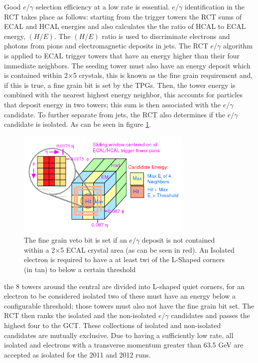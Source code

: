Good $e/\gamma$ selection efficiency at a low rate is essential. $e/\gamma$
identification in the RCT takes place as follows: starting from the trigger towers
the RCT sums of ECAL and HCAL energies and also calculates the
the ratio of HCAL to ECAL energy, $(H/E)$. The $(H/E)$ ratio is used to
discriminate electrons and photons from pions and electromagnetic deposits
in jets. 
The RCT $e/\gamma$ algorithm is applied to ECAL trigger towers that have an energy
higher than their four immediate neighbors. The seeding tower must also 
have an energy deposit which is contained within 2$\times$5 crystals, 
this is known as the fine grain requirement and, if this is true,
a fine grain bit is set by the TPGs. 
Then, the tower energy is combined with the nearest highest energy neighbor,
this accounts for particles that deposit energy in two towers; this sum is then
associated with the $e/\gamma$ candidate.
To further separate from jets, the RCT also determines if the $e/\gamma$ candidate
is isolated. As can be seen in figure \ref{fig:emRCTalgo}.
\begin{figure}[hb]
  \centering
	\includegraphics[width=0.75\textwidth]{images/emRCTalgo.png}
  	\caption[e/$\gamma$ Fine Grain and Isolation]
   	{The fine grain veto bit is set if an $e/\gamma$ deposit is not contained
	within a 2$\times$5 ECAL crystal area (as can be seen in red). An Isolated
	electron is required to have a at least twi of the L-Shaped corners (in tan) 
	to below a certain threshold}
	\label{fig:emRCTalgo}
\end{figure}
the 8 towers around the central are divided into L-shaped quiet corners,
for an electron to be considered isolated two of these must have an energy
below a configurable threshold; those towers must also not have the fine grain
bit set.
The RCT then ranks the isolated and the non-isolated $e/\gamma$ candidates
and passes the highest four to the GCT. These collections of isolated and non-isolated
candidates are mutually exclusive. Due to having a sufficiently low rate, all isolated
and electrons with a transverse momentum greater than 63.5 GeV
are accepted as isolated for the 2011 and 2012 runs. 

